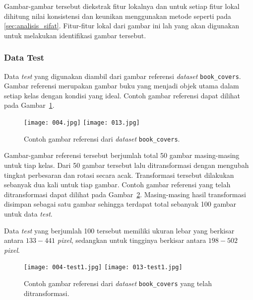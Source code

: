 Gambar-gambar tersebut diekstrak fitur lokalnya dan untuk setiap fitur lokal dihitung nilai konsistensi dan keunikan menggunakan metode seperti pada \ref{sec:analisis_sifat}. Fitur-fitur lokal dari gambar ini lah yang akan digunakan untuk melakukan identifikasi gambar tersebut.

\subsubsection{Data Test}
Data \textit{test} yang digunakan diambil dari gambar referensi \textit{dataset} \texttt{book\_covers}. Gambar referensi merupakan gambar buku yang menjadi objek utama dalam setiap kelas dengan kondisi yang ideal. Contoh gambar referensi dapat dilihat pada Gambar~\ref{fig:referensi_book_covers}.

\begin{figure}[H]
	\centering
	\texttt{[image: 004.jpg]}
	\texttt{[image: 013.jpg]}
	\caption{Contoh gambar referensi dari \textit{dataset} \texttt{book\_covers}.}
	\label{fig:referensi_book_covers}
\end{figure}

Gambar-gambar referensi tersebut berjumlah total 50 gambar masing-masing untuk tiap kelas. Dari 50 gambar tersebut lalu ditransformasi dengan mengubah tingkat perbesaran dan rotasi secara acak. Transformasi tersebut dilakukan sebanyak dua kali untuk tiap gambar. Contoh gambar referensi yang telah ditransformasi dapat dilihat pada Gambar~\ref{fig:transformasi_book_covers}. Masing-masing hasil transformasi disimpan sebagai satu gambar sehingga terdapat total sebanyak 100 gambar untuk data \textit{test}.

Data \textit{test} yang berjumlah 100 tersebut memiliki ukuran lebar yang berkisar antara $133 - 441$ \textit{pixel}, sedangkan untuk tingginya berkisar antara $198 - 502$ \textit{pixel}.

\begin{figure}[H]
	\centering
	\texttt{[image: 004-test1.jpg]}
	\texttt{[image: 013-test1.jpg]}
	\caption{Contoh gambar referensi dari \textit{dataset} \texttt{book\_covers} yang telah ditransformasi.}
	\label{fig:transformasi_book_covers}
\end{figure}

